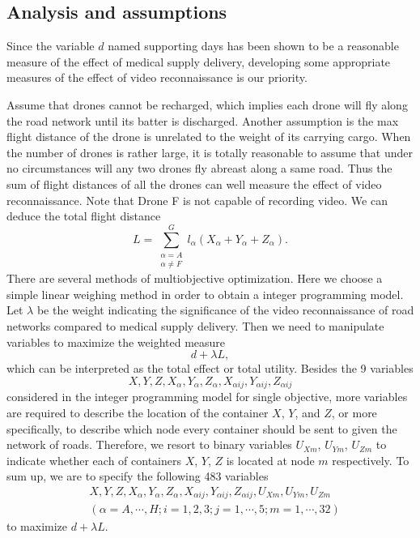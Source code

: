 \documentclass{mcmthesis}
\begin{document}
\subsection{Analysis and assumptions}
 Since the variable $d$ named supporting days has been shown to be a reasonable measure of the effect of medical supply delivery, developing some appropriate measures of the effect of video reconnaissance is our priority.

\noindent Assume that drones cannot be recharged, which implies each drone will fly along the road network until its batter is discharged. Another assumption is the max flight distance of the drone is unrelated to the weight of its carrying cargo. When the number of drones is rather large, it is totally reasonable to assume that under no circumstances will any two drones fly abreast along a same road. Thus the sum of flight distances of all the drones can well measure the effect of video reconnaissance. Note that Drone F is not capable of recording video. We can deduce the total flight distance
\[
L=\sum_{\substack{\alpha=A\\ \alpha\ne F}}^{G}l_\alpha (X_\alpha+Y_\alpha+Z_\alpha).
\]
There are several methods of multiobjective optimization. Here we choose a simple linear weighing method in order to obtain a integer programming model. Let $\lambda$ be the weight indicating the significance of the video reconnaissance of road networks compared to medical supply delivery. Then we need to manipulate variables to maximize the weighted measure
\[
d+\lambda L,
\] 
which can be interpreted as the total effect or total utility. 
Besides the 9 variables
\[
X,Y,Z,X_{\alpha},Y_{\alpha},Z_{\alpha},X_{\alpha ij},Y_{\alpha ij},Z_{\alpha ij}
\]
considered in the integer programming model for single objective, more variables are required to describe the location of the container $X$, $Y$, and $Z$, or more specifically, to describe which node  every container should be sent to given the network of roads. Therefore, we resort to binary variables $U_{Xm}$, $U_{Ym}$, $U_{Zm}$ to indicate whether each of containers $X$, $Y$, $Z$ is located at node $m$ respectively. To sum up, we are to specify the following 483 variables
\begin{align*}
	&X,Y,Z,X_{\alpha},Y_{\alpha},Z_{\alpha},X_{\alpha ij},Y_{\alpha ij},Z_{\alpha ij},U_{Xm},U_{Ym},U_{Zm}\\
	&(\alpha=A,\cdots,H;i=1,2,3;j=1,\cdots,5;m=1,\cdots,32)
\end{align*}
to maximize $d+\lambda L$.
\end{document}
